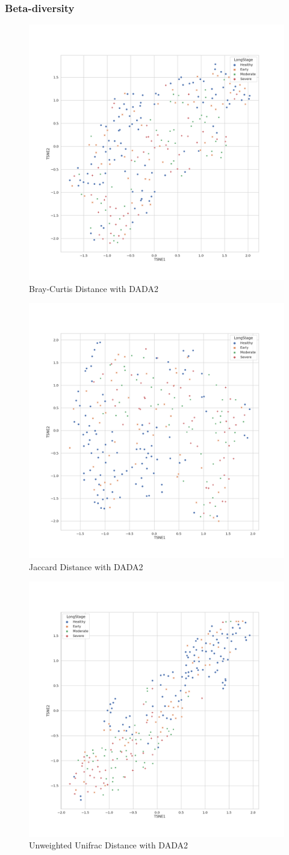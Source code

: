 \documentclass{beamer}
\begin{document}
    \begin{frame}[allowframebreaks]
        \frametitle{Beta-diversity}

        \begin{figure}
            \includegraphics[width=0.5 \linewidth]{figures/BetaDiversity/DADA2.bray_curtis.png}
            \caption{Bray-Curtis Distance with DADA2}
        \end{figure}

        \begin{figure}
            \includegraphics[width=0.5 \linewidth]{figures/BetaDiversity/DADA2.jaccard.png}
            \caption{Jaccard Distance with DADA2}
        \end{figure}

        \begin{figure}
            \includegraphics[width=0.5 \linewidth]{figures/BetaDiversity/DADA2.unweighted_unifrac.png}
            \caption{Unweighted Unifrac Distance with DADA2}
        \end{figure}


\end{frame}
\end{document}
